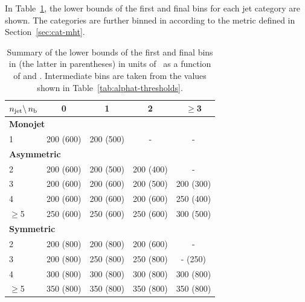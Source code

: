 In Table~\ref{tab:binning-summary}, the lower bounds of the first and final \scalht
bins for each jet category are shown. The categories are further binned in \mht
according to the metric defined in Section~\ref{sec:cat-mht}.

\begin{table}[htb!]
  \caption{Summary of the lower bounds of the first and final bins
    in \scalht (the latter in parentheses) in units of \GeV~as a function of \njet and
    \nb. Intermediate \scalht bins are taken from the values shown in Table~\ref{tab:alphat-thresholds}.
  \label{tab:binning-summary}}
  \centering
  \footnotesize
  \begin{tabular}{ lcccc }
    \hline
    $n_{\text{jet}} \backslash\, n_{\mathrm{b}}$ & 0         & 1         & 2         & $\geq$3                       \\
    \hline
    \multicolumn{5}{l}{\bf Monojet}                                                              \\
    1                        & 200 (600) & 200 (500) & -     & -                         \\
    \multicolumn{5}{l}{\bf Asymmetric}                                                           \\
    2                        & 200 (600) & 200 (500) & 200 (400) & -                         \\
    3                        & 200 (600) & 200 (600) & 200 (500) & 200 (300)                     \\
    4                        & 200 (600) & 200 (600) & 200 (600) & 250 (400)                     \\
    $\geq$5                  & 250 (600) & 250 (600) & 250 (600) & 300 (500)                     \\
    \multicolumn{5}{l}{\bf Symmetric}                                                            \\
    2                        & 200 (800) & 200 (800) & 200 (600) & -                         \\
    3                        & 200 (800) & 250 (800) & 250 (800) & \phantom{0}-\phantom{0} (250) \\
    4                        & 300 (800) & 300 (800) & 300 (800) & 300 (800)                     \\
    $\geq$5                  & 350 (800) & 350 (800) & 350 (800) & 350 (800)                     \\
    \hline
  \end{tabular}
\end{table}

